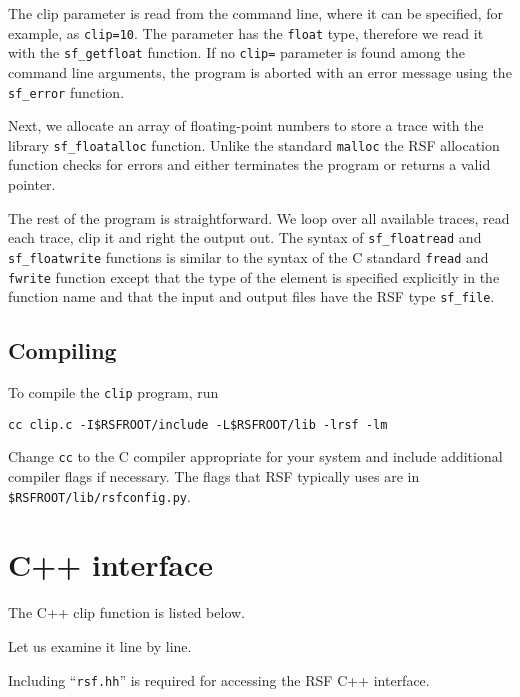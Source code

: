  
The clip parameter is read from the command line, where it can be
specified, for example, as \texttt{clip=10}. The parameter has the
\texttt{float} type, therefore we read it with the
\texttt{sf\_getfloat} function. If no \texttt{clip=} parameter is
found among the command line arguments, the program is aborted with an
error message using the \texttt{sf\_error} function.

 
Next, we allocate an array of floating-point numbers to store a trace
with the library \texttt{sf\_floatalloc} function. Unlike the standard
\texttt{malloc} the RSF allocation function checks for errors and
either terminates the program or returns a valid pointer.

 
The rest of the program is straightforward. We loop over all available
traces, read each trace, clip it and right the output out. The syntax
of \texttt{sf\_floatread} and \texttt{sf\_floatwrite} functions is
similar to the syntax of the C standard \texttt{fread} and
\texttt{fwrite} function except that the type of the element is
specified explicitly in the function name and that the input and
output files have the RSF type \texttt{sf\_file}.

\subsection{Compiling}

To compile the \texttt{clip} program, run
\begin{verbatim}
cc clip.c -I$RSFROOT/include -L$RSFROOT/lib -lrsf -lm
\end{verbatim}
Change \texttt{cc} to the C compiler appropriate for your system and include
additional compiler flags if necessary. The flags that RSF typically uses are
in \texttt{\$RSFROOT/lib/rsfconfig.py}.

\section{C++ interface}

\lstset{language=c++}

The C++ clip function is listed below.


Let us examine it line by line. 


Including ``\texttt{rsf.hh}'' is required for accessing the RSF C++
interface.

